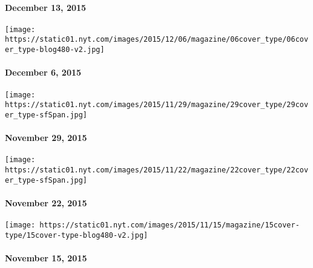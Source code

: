 \hypertarget{december-13-2015}{%
\paragraph{December 13, 2015}\label{december-13-2015}}

\href{http://www.nytimes.com/indexes/2015/12/06/magazine/index.html}{}

\texttt{[image: https://static01.nyt.com/images/2015/12/06/magazine/06cover\_type/06cover\_type-blog480-v2.jpg]}

\hypertarget{december-6-2015}{%
\paragraph{December 6, 2015}\label{december-6-2015}}

\href{http://www.nytimes.com/indexes/2015/11/29/magazine/index.html}{}

\texttt{[image: https://static01.nyt.com/images/2015/11/29/magazine/29cover\_type/29cover\_type-sfSpan.jpg]}

\hypertarget{november-29-2015}{%
\paragraph{November 29, 2015}\label{november-29-2015}}

\href{http://www.nytimes.com/indexes/2015/11/22/magazine/index.html}{}

\texttt{[image: https://static01.nyt.com/images/2015/11/22/magazine/22cover\_type/22cover\_type-sfSpan.jpg]}

\hypertarget{november-22-2015}{%
\paragraph{November 22, 2015}\label{november-22-2015}}

\href{http://www.nytimes.com/indexes/2015/11/15/magazine/index.html}{}

\texttt{[image: https://static01.nyt.com/images/2015/11/15/magazine/15cover-type/15cover-type-blog480-v2.jpg]}

\hypertarget{november-15-2015}{%
\paragraph{November 15, 2015}\label{november-15-2015}}

\href{http://www.nytimes.com/indexes/2015/11/08/magazine/index.html}{}

